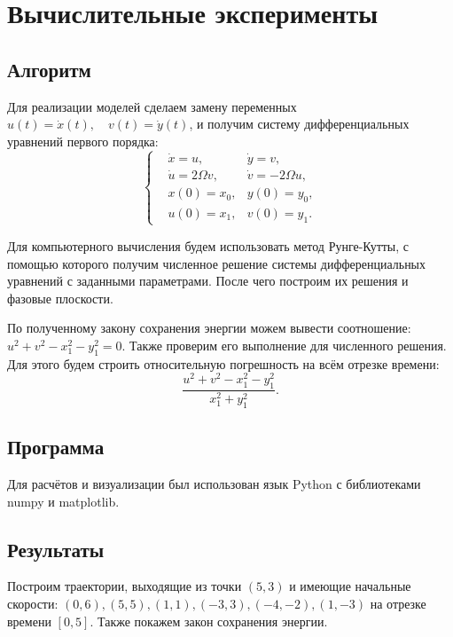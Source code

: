 \section{Вычислительные эксперименты}

    \subsection{Алгоритм}
        Для реализации моделей сделаем замену переменных \( u(t) = \dot{x}(t), \quad v(t) = \dot{y}(t) \), и получим систему дифференциальных уравнений первого порядка:
        \[
            \left\{\begin{split}
                & \dot{x} = u, & \dot{y} = v, \\
                & \dot{u} = 2 \Omega v, & \dot{v} = -2 \Omega u, \\
                & x(0) = x_0, & y(0) = y_0, \\
                & u(0) = x_1, & v(0) = y_1.
            \end{split}\right.
        \]

        Для компьютерного вычисления будем использовать метод Рунге-Кутты, с помощью которого получим численное решение системы дифференциальных уравнений с заданными параметрами. После чего построим их решения и фазовые плоскости.

        По полученному закону сохранения энергии можем вывести соотношение: \( u^2 + v^2 - x_1^2 - y_1^2 = 0 \). Также проверим его выполнение для численного решения. Для этого будем строить относительную погрешность на всём отрезке времени:
        \[
            \frac{u^2 + v^2 - x_1^2 - y_1^2}{x_1^2 + y_1^2}.
        \]



    \subsection{Программа}
        Для расчётов и визуализации был использован язык Python с библиотеками numpy и matplotlib.

        

    \subsection{Результаты}
        Построим траектории, выходящие из точки \( (5, 3) \) и имеющие начальные скорости: \( (0, 6), (5, 5), (1, 1), (-3, 3), (-4, -2), (1, -3) \) на отрезке времени \( [0, 5] \). Также покажем закон сохранения энергии.

